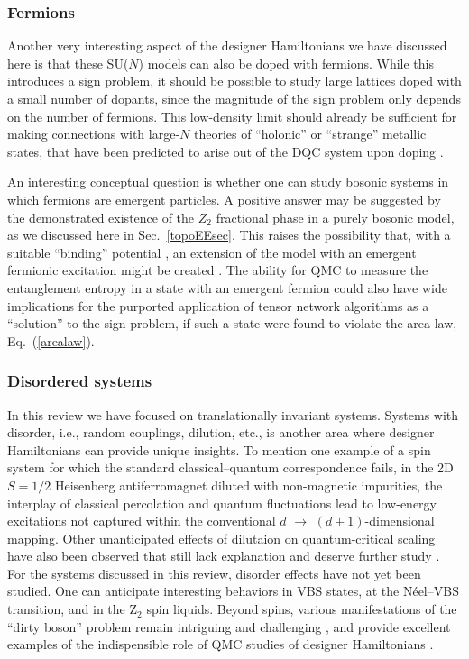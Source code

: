 \documentclass[range]{ar2e}
\begin{document}
\subsubsection{Fermions}

Another very interesting aspect of the designer Hamiltonians we have discussed here is that these SU($N$) models can also be doped with fermions. While this 
introduces a sign problem, it should be possible to study large lattices doped with a small number of dopants, since the magnitude of the 
sign problem only depends on the number of fermions. This low-density limit should already be sufficient for making connections with 
large-$N$ theories of ``holonic'' or ``strange'' metallic states, that have been predicted to arise out of the DQC system upon 
doping \cite{kaul2008:u1}.

An interesting conceptual question is whether one can study bosonic systems in which fermions are emergent particles.
A positive answer may be suggested by the demonstrated existence of the $Z_2$ fractional phase in a purely bosonic model, as we
discussed here in Sec.~\ref{topoEEsec}. This raises the possibility that, with a suitable ``binding'' potential \cite{FermionBind}, an extension of 
the model with an emergent fermionic excitation might be created \cite{Wenbook}.  
The ability for QMC to measure the entanglement entropy in a state with an emergent fermion
could also have wide implications for the purported application of tensor network algorithms as a ``solution'' to the sign problem, 
if such a state were found to violate the area law, Eq.~(\ref{arealaw}). 

\subsubsection{Disordered systems}

In this review we have focused on translationally invariant systems. Systems with disorder, i.e., random couplings, dilution, etc., is another area
where designer Hamiltonians can provide unique insights. To mention one example of a spin system for which the standard classical--quantum correspondence 
fails, in the 2D $S=1/2$ Heisenberg antiferromagnet diluted with non-magnetic impurities, the interplay of classical percolation and quantum fluctuations 
lead to low-energy excitations \cite{Wang10} not captured \cite{Vojta05} within the conventional $d$ $\to$ $(d+1)$-dimensional mapping. Other unanticipated effects
of dilutaion on quantum-critical scaling have also been observed that still lack explanation and deserve further study \cite{Sandvik06,Yao10}. For the systems 
discussed in this review, disorder effects have not yet been studied. One can anticipate interesting behaviors in VBS states, at the N\'eel--VBS transition, and 
in the Z$_2$ spin liquids. Beyond spins, various manifestations of the ``dirty boson'' problem remain intriguing and challenging \cite{Pollet09,Meier12,Iyer12}, 
and provide excellent examples of the indispensible role of QMC studies of designer Hamiltonians \cite{Gurarie09}.
\end{document}
